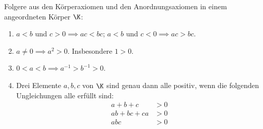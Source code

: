 \begin{prob}
  Folgere aus den Körperaxiomen und den Anordnungsaxiomen in einem angeordneten
  Körper $\K$:
  \begin{enumerate}[label=(\alph*)]
  \item $a < b$ und $c > 0 \implies ac < bc$; $a < b$ und
    $c < 0 \implies ac > bc$.
  \item $a \neq 0 \implies a^2 > 0$. Insbesondere $1 > 0$.
  \item $0 < a < b \implies a^{-1} > b^{-1} >0$.
  \item Drei Elemente $a, b, c$ von $\K$ sind genau dann alle positiv, wenn die
    folgenden Ungleichungen alle erfüllt sind:
    \begin{equation*}
      \begin{split}
        a + b + c    & > 0 \\
        ab + bc + ca & > 0 \\
        abc          & > 0
      \end{split}
    \end{equation*}
  \end{enumerate}
\end{prob}
